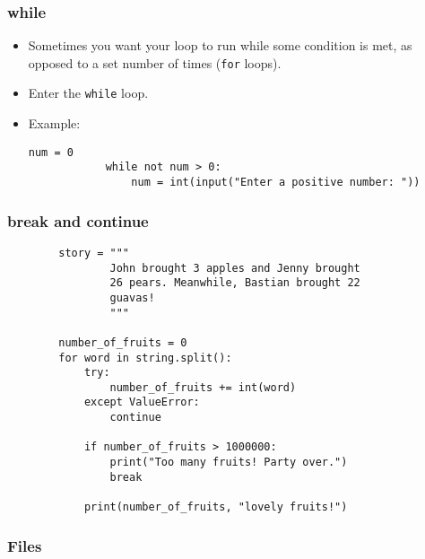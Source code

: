 \documentclass[notes]{beamer}
\begin{document}
	\begin{frame}[fragile]
		\frametitle{while}
		\begin{itemize}
			\item Sometimes you want your loop to run while some condition is met, as opposed to a set number of times (\lstinline|for| loops).
			\item Enter the \lstinline|while| loop.
			\pause
			\item Example:
			\begin{lstlisting}[basicstyle=\scriptsize\tt]
			num = 0
			while not num > 0:
			    num = int(input("Enter a positive number: "))
			\end{lstlisting}

		\end{itemize}
	\end{frame}
	
	\begin{frame}[fragile]
		\frametitle{break and continue}
		\begin{lstlisting}
		story = """
		        John brought 3 apples and Jenny brought
		        26 pears. Meanwhile, Bastian brought 22
		        guavas!
		        """

		number_of_fruits = 0
		for word in string.split():
		    try:
		        number_of_fruits += int(word)
		    except ValueError:
		        continue
		
		    if number_of_fruits > 1000000:
		        print("Too many fruits! Party over.")
		        break
		
		    print(number_of_fruits, "lovely fruits!")
		\end{lstlisting}
	\end{frame}
	
	\begin{frame}[fragile]
		\frametitle{Files}
	\end{frame}
\end{document}
